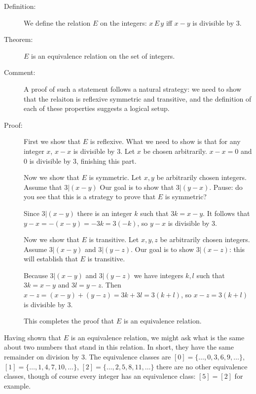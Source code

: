 \documentclass[12pt]{article}
\begin{document}
\begin{description}

\item[Definition:]  We define the relation $E$ on the integers:  $x \, E \, y$ iff $x-y$ is divisible by 3.

\item[Theorem:]  $E$ is an equivalence relation on the set of integers.

\item[Comment:]  A proof of such a statement follows a natural strategy:  we need to show that the relaiton is reflexive symmetric and transitive, and the definition of each of these properties suggests a logical setup.

\item[Proof:]  First we show that $E$ is reflexive.  What we need to show is that for any integer $x$, $x-x$ is divisible by 3.  Let $x$ be chosen arbitrarily.  $x-x=0$ and 0 is divisible by 3, finishing this part.

Now we show that $E$ is symmetric.  Let $x,y$ be arbitrarily chosen integers.  Assume that $3|(x-y)$  Our goal is to show that $3|(y-x)$.  Pause:  do you see that this is a strategy to prove that $E$ is symmetric?

Since $3|(x-y)$ there is an integer $k$ such that $3k=x-y$.  It follows that $y-x = -(x-y) = -3k = 3(-k)$, so $y-x$ is divisible by 3.

Now we show that $E$ is transitive.  Let $x,y,z$ be arbitrarily chosen integers.  Assume $3|(x-y)$ and $3|(y-z)$.
Our goal is to show $3|(x-z)$:  this will establish that $E$ is transitive.

Because $3|(x-y)$ and $3|(y-z)$ we have integers $k,l$ such that $3k=x-y$ and $3l=y-z$.  Then $x-z = (x-y) + (y-z) = 3k + 3l = 3(k+l)$, so $x-z = 3(k+l)$ is divisible by 3.

This completes the proof that $E$ is an equivalence relation.

\end{description}

Having shown that $E$ is an equivalence relation, we might ask what is the same about two numbers that stand in this relation.  In short, they have the same remainder on division by 3.  The equivalence classes are $[0] = \{\ldots,0,3,6,9,\ldots\}$,   $[1] = \{\ldots,1,4,7,10,\ldots\}$, $[2] = \{\ldots,2,5,8,11,\ldots\}$  there are no other equivalence classes, though of course every integer has an equivalence class:  $[5]=[2]$ for example.
\end{document}
